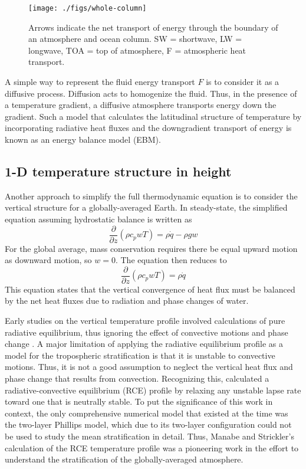 \documentclass{article}
\begin{document}
\begin{figure}
\centering
\texttt{[image: ./figs/whole-column]}
\caption{Arrows indicate the net transport of energy through the boundary of an atmosphere and ocean column. SW = shortwave, LW = longwave, TOA = top of atmosphere, F = atmospheric heat transport.}
\label{fig:whole-column}
\end{figure}

A simple way to represent the fluid energy transport $F$ is to consider it as a diffusive process. Diffusion acts to homogenize the fluid. Thus, in the presence of a temperature gradient, a diffusive atmosphere transports energy down the gradient. Such a model that calculates the latitudinal structure of temperature by incorporating radiative heat fluxes and the downgradient transport of energy is known as an energy balance model (EBM).

\subsection{1-D temperature structure in height} \label{subsec:1-d-height}

Another approach to simplify the full thermodynamic equation is to consider the vertical structure for a globally-averaged Earth. In steady-state, the simplified equation assuming hydrostatic balance is written as
\begin{equation}
\frac{\partial}{\partial z}(\rho c_p w T) = \rho \dot{q} - \rho g w
\end{equation} 
For the global average, mass conservation requires there be equal upward motion as downward motion, so $w=0$. The equation then reduces to 
\begin{equation}
\frac{\partial}{\partial z}(\rho c_p w T) = \rho \dot{q} 
\end{equation} 
This equation states that the vertical convergence of heat flux must be balanced by the net heat fluxes due to radiation and phase changes of water.

Early studies on the vertical temperature profile involved calculations of pure radiative equilibrium, thus ignoring the effect of convective motions and phase change \citep{humphreys-1909, manabe-moller-1961}. A major limitation of applying the radiative equilibrium profile as a model for the tropospheric stratification is that it is unstable to convective motions. Thus, it is not a good assumption to neglect the vertical heat flux and phase change that results from convection. Recognizing this, \citet{manabe-strickler-1964} calculated a radiative-convective equilibrium (RCE) profile by relaxing any unstable lapse rate toward one that is neutrally stable. To put the significance of this work in context, the only comprehensive numerical model that existed at the time was the two-layer Phillips model, which due to its two-layer configuration could not be used to study the mean stratification in detail. Thus, Manabe and Strickler's calculation of the RCE temperature profile was a pioneering work in the effort to understand the stratification of the globally-averaged atmosphere.
\end{document}
